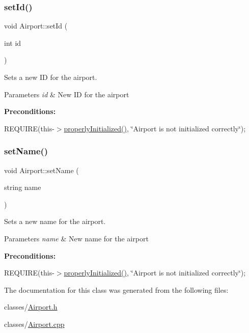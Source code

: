 \subsubsection{\texorpdfstring{set\+Id()}{setId()}}
{\footnotesize\ttfamily void Airport\+::set\+Id (\begin{DoxyParamCaption}\item[{int}]{id }\end{DoxyParamCaption})}



Sets a new ID for the airport. 


\begin{DoxyParams}{Parameters}
{\em id} & New ID for the airport\\
\hline
\end{DoxyParams}
{\bfseries Preconditions\+:}
\begin{DoxyItemize}
\item R\+E\+Q\+U\+I\+RE(this-\/$>$\mbox{\hyperlink{class_airport_aa13e68ac58e8875837fbe888325cfff6}{properly\+Initialized()}}, \char`\"{}\+Airport is not initialized correctly\char`\"{}); 
\end{DoxyItemize}\mbox{\label{class_airport_a064fd9435cd179b04d94c04a18a96583}} 
\subsubsection{\texorpdfstring{set\+Name()}{setName()}}
{\footnotesize\ttfamily void Airport\+::set\+Name (\begin{DoxyParamCaption}\item[{string}]{name }\end{DoxyParamCaption})}



Sets a new name for the airport. 


\begin{DoxyParams}{Parameters}
{\em name} & New name for the airport\\
\hline
\end{DoxyParams}
{\bfseries Preconditions\+:}
\begin{DoxyItemize}
\item R\+E\+Q\+U\+I\+RE(this-\/$>$\mbox{\hyperlink{class_airport_aa13e68ac58e8875837fbe888325cfff6}{properly\+Initialized()}}, \char`\"{}\+Airport is not initialized correctly\char`\"{}); 
\end{DoxyItemize}

The documentation for this class was generated from the following files\+:\begin{DoxyCompactItemize}
\item 
classes/\mbox{\hyperlink{_airport_8h}{Airport.\+h}}\item 
classes/\mbox{\hyperlink{_airport_8cpp}{Airport.\+cpp}}\end{DoxyCompactItemize}
